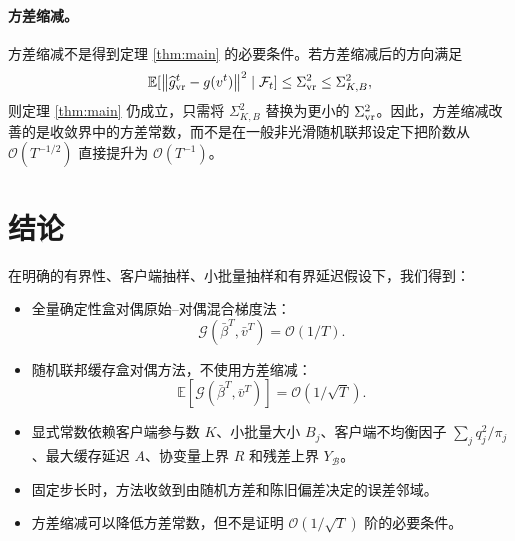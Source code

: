 \documentclass[UTF8,a4paper,11pt]{ctexart}
\newcommand{\E}{\mathbb{E}}
\newcommand{\B}{\mathcal{B}}
\newcommand{\F}{\mathcal{F}}
\newcommand{\Gap}{\mathcal{G}}
\newcommand{\norm}[1]{\left\|#1\right\|}
\begin{document}
\paragraph{方差缩减。}
方差缩减不是得到定理 \ref{thm:main} 的必要条件。若方差缩减后的方向满足
\[
    \E[
    \norm{\widehat g_{\rm vr}^t-g(v^t)}^2
    \mid\F_t]
    \le
    \Sigma_{\rm vr}^2
    \le
    \Sigma_{K,B}^2,
\]
则定理 \ref{thm:main} 仍成立，只需将 $\Sigma_{K,B}^2$ 替换为更小的
$\Sigma_{\rm vr}^2$。因此，方差缩减改善的是收敛界中的方差常数，而不是在一般非光滑随机联邦设定下把阶数从 $\mathcal{O}(T^{-1/2})$ 直接提升为 $\mathcal{O}(T^{-1})$。

\section{结论}

在明确的有界性、客户端抽样、小批量抽样和有界延迟假设下，我们得到：
\begin{itemize}[leftmargin=2em]
    \item 全量确定性盒对偶原始--对偶混合梯度法：
    \[
        \Gap(\bar{\beta}^T,\bar v^T)=\mathcal{O}(1/T).
    \]
    \item 随机联邦缓存盒对偶方法，不使用方差缩减：
    \[
        \E[\Gap(\bar{\beta}^T,\bar v^T)]
        =
        \mathcal{O}(1/\sqrt{T}).
    \]
    \item 显式常数依赖客户端参与数 $K$、小批量大小 $B_j$、客户端不均衡因子
    $\sum_j q_j^2/\pi_j$、最大缓存延迟 $A$、协变量上界 $R$ 和残差上界
    $Y_\B$。
    \item 固定步长时，方法收敛到由随机方差和陈旧偏差决定的误差邻域。
    \item 方差缩减可以降低方差常数，但不是证明 $\mathcal{O}(1/\sqrt{T})$ 阶的必要条件。
\end{itemize}
\end{document}

